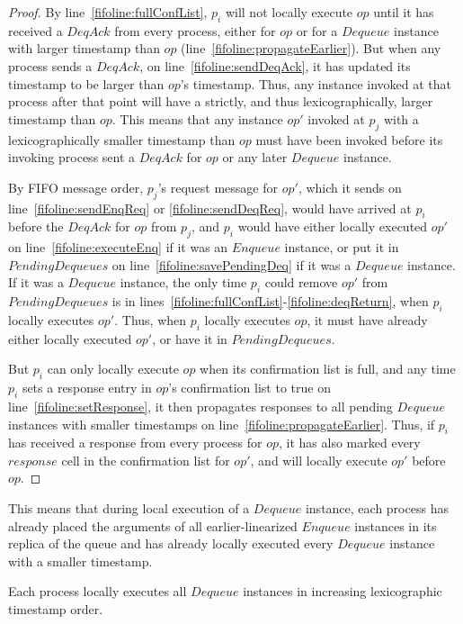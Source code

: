 \documentclass[a4paper,anonymous,USenglish]{lipics-v2021}
\theoremstyle{definition}
\begin{document}
\begin{proof}
  By line~\ref{fifoline:fullConfList}, $p_i$ will not locally execute $op$ until it has received a $DeqAck$ from every process, either for $op$ or for a $Dequeue$ instance with larger timestamp than $op$ (line~\ref{fifoline:propagateEarlier}).  But when any process sends a $DeqAck$, on line~\ref{fifoline:sendDeqAck}, it has updated its timestamp to be larger than $op$'s timestamp.  Thus, any instance invoked at that process after that point will have a strictly, and thus lexicographically, larger timestamp than $op$.  This means that any instance $op'$ invoked at $p_j$ with a lexicographically smaller timestamp than $op$ must have been invoked before its invoking process sent a $DeqAck$ for $op$ or any later $Dequeue$ instance.

  By FIFO message order, $p_j$'s request message for $op'$, which it sends on line~\ref{fifoline:sendEnqReq} or \ref{fifoline:sendDeqReq}, would have arrived at $p_i$ before the $DeqAck$ for $op$ from $p_j$, and $p_i$ would have either locally executed $op'$ on line~\ref{fifoline:executeEnq} if it was an $Enqueue$ instance, or put it in $PendingDequeues$ on line~\ref{fifoline:savePendingDeq} if it was a $Dequeue$ instance.  If it was a $Dequeue$ instance, the only time $p_i$ could remove $op'$ from $PendingDequeues$ is in lines~\ref{fifoline:fullConfList}-\ref{fifoline:deqReturn}, when $p_i$ locally executes $op'$.  Thus, when $p_i$ locally executes $op$, it must have already either locally executed $op'$, or have it in $PendingDequeues$.

  But $p_i$ can only locally execute $op$ when its confirmation list is full, and any time $p_i$ sets a response entry in $op$'s confirmation list to true on line~\ref{fifoline:setResponse}, it then propagates responses to all pending $Dequeue$ instances with smaller timestamps on line~\ref{fifoline:propagateEarlier}.  Thus, if $p_i$ has received a response from every process for $op$, it has also marked every $response$ cell in the confirmation list for $op'$, and will locally execute $op'$ before $op$.
\end{proof}

This means that during local execution of a $Dequeue$ instance, each process has already placed the arguments of all earlier-linearized $Enqueue$ instances in its replica of the queue and has already locally executed every $Dequeue$ instance with a smaller timestamp.  

\begin{corollary}\label{fifolem:localExecOrder}
  Each process locally executes all $Dequeue$ instances in increasing lexicographic timestamp order.
\end{corollary}
\end{document}
